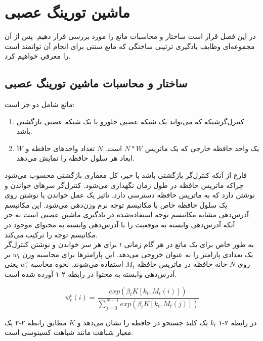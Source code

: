 \chapter{ماشین تورینگ عصبی}
در این فصل قرار است ساختار و محاسبات ماتع را مورد بررسی قرار دهیم. پس از آن مجموعه‌ای وظایف یادگیری ترتیبی ساختگی که ماتع سنتی برای انجام آن توانمند است را معرفی خواهیم کرد.

\section{ساختار و محاسبات ماشین تورینگ عصبی}
ماتع شامل دو جز است:
\begin{enumerate}
\item کنترل‌گرشبکه که می‌تواند یک شبکه عصبی جلورو  یا یک شبکه عصبی بازگشتی باشد.
\item یک واحد حافظه خارجی که یک ماتریس  $N*W$ است. $N$ تعداد واحد‌های حافظه و $W$ ابعاد هر سلول حافظه را نمایش می‌دهد.\cite{collier2018implementing}
\end{enumerate}

فارغ از آنکه کنترل‌گر بازگشتی باشد یا خیر، کل معماری بازگشتی محسوب می‌شود چراکه ماتریس حافظه در طول زمان نگهداری می‌شود. کنترل‌گر سرهای خواندن و نوشتن دارد که به ماتریس حافظه دسترسی دارد. تاثیر یک عمل خواندن یا نوشتن روی یک سلول حافظه خاص با مکانیسم توجه نرم وزن‌دهی می‌شود. این مکانیسم آدرس‌دهی مشابه مکانیسم توجه استفاده‌شده در یادگیری ماشین عصبی است به جز آنکه آدرس‌دهی وابسته به موقعیت را با آدرس‌دهی وابسته به محتوای موجود در مکانیسم توجه  را ترکیب می‌کند.\cite{collier2018implementing}
\\

به طور خاص برای یک ماتع در هر گام زمانی $t$ برای هر سر خواندن و نوشتن کنترل‌گر یک تعدادی پارامتر را به عنوان خروجی می‌دهد. این پارامتر‌ها برای محاسبه وزن $w_t$ بر روی $N$ خانه حافظه در ماتریس حافظه $M_t$ استفاده می‌شوند. نحوه محاسبه $w_t^c$ یعنی آدرس‌دهی وابسته به محتوا در رابطه ۲-۱ آورده شده است.\cite{collier2018implementing}

\begin{equation}
w^c_t(i) = \frac{exp(\beta_t K[k_t,M_t(i)])}{\sum_{j=0}^{N-1} exp(\beta_t K[k_t,M_t(j)])}
\end{equation}

در رابطه ۲-۱ $k_t$ یک کلید جستجو در حافظه را نشان می‌دهد و $K$ مطابق رابطه ۲-۲ یک معیار شباهت مانند شباهت کسینوسی است.\cite{collier2018implementing}


